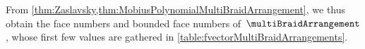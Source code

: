 \documentclass{amsart}
\theoremstyle{definition}
\begin{document}
From \cref{thm:Zaslavsky,thm:MobiusPolynomialMultiBraidArrangement}, we thus obtain the face numbers and bounded face numbers of~$\multiBraidArrangement$, whose first few values are gathered in \cref{table:fvectorMultiBraidArrangements}.

\end{document}
